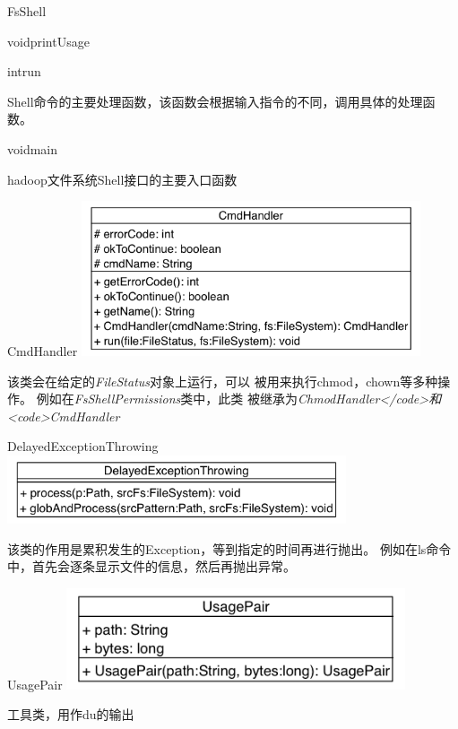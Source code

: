 \begin{XeClass}{FsShell}
\begin{XeMethod}{\XePrivate}{void}{printUsage}
    \end{XeMethod}

    \begin{XeMethod}{\XePublic}{int}{run}
         
 Shell命令的主要处理函数，该函数会根据输入指令的不同，调用具体的处理函数。

    \end{XeMethod}

    \begin{XeMethod}{\XePublic}{void}{main}
         
 hadoop文件系统Shell接口的主要入口函数

    \end{XeMethod}


    \begin{XeInnerClass}{CmdHandler}
\includegraphics[width=10cm]{cdig/CmdHandler.png}
         
 该类会在给定的\emph{FileStatus}对象上运行，可以
 被用来执行chmod，chown等多种操作。
 例如在\emph{FsShellPermissions}类中，此类
 被继承为\emph{ChmodHandler</code>和<code>CmdHandler}

    \end{XeInnerClass}
    \begin{XeInnerClass}{DelayedExceptionThrowing}
\includegraphics[width=10cm]{cdig/DelayedExceptionThrowing.png}
         
 该类的作用是累积发生的Exception，等到指定的时间再进行抛出。
 例如在ls命令中，首先会逐条显示文件的信息，然后再抛出异常。

    \end{XeInnerClass}
    \begin{XeInnerClass}{UsagePair}
\includegraphics[width=10cm]{cdig/UsagePair.png}
         
 工具类，用作du的输出

    \end{XeInnerClass}
\end{XeClass}
